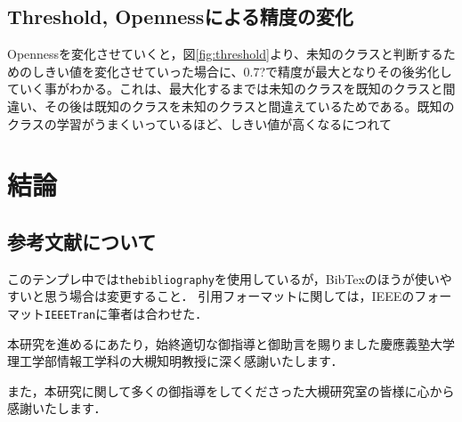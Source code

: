 \section{Threshold, Opennessによる精度の変化}


Opennessを変化させていくと，図\ref{fig:threshold}より、未知のクラスと判断するためのしきい値を変化させていった場合に、0.7?で精度が最大となりその後劣化していく事がわかる。これは、最大化するまでは未知のクラスを既知のクラスと間違い、その後は既知のクラスを未知のクラスと間違えているためである。既知のクラスの学習がうまくいっているほど、しきい値が高くなるにつれて

\chapter{結論}

\section{参考文献について}
このテンプレ中では{\tt thebibliography}を使用しているが，BibTexのほうが使いやすいと思う場合は変更すること．
引用フォーマットに関しては，IEEEのフォーマット{\tt IEEETran}に筆者は合わせた．

\begin{acknowledgment}

本研究を進めるにあたり，始終適切な御指導と御助言を賜りました慶應義塾大学理工学部情報工学科の大槻知明教授に深く感謝いたします．

また，本研究に関して多くの御指導をしてくださった大槻研究室の皆様に心から感謝いたします．


\end{acknowledgment}

